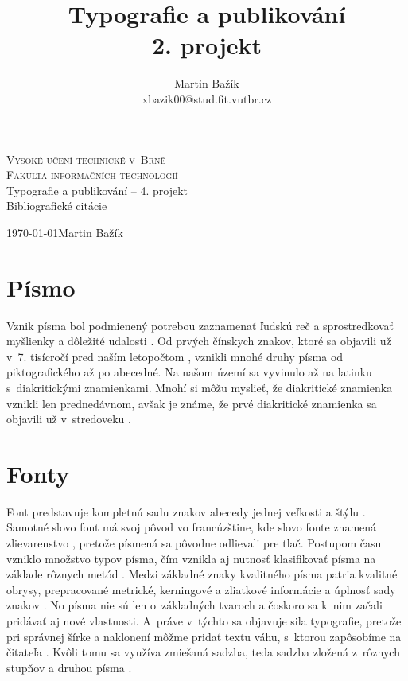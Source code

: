 \documentclass[a4paper,11pt]{article}
\author{Martin Bažík \\ xbazik00@stud.fit.vutbr.cz}
\title{Typografie a publikování \\ 2. projekt}
\begin{document}
	\begin{titlepage}
		\begin{center}
			\textsc{\Huge Vysoké učení technické v~Brně}\\
			\textsc{\huge Fakulta informačních technologií}
			\\{\LARGE Typografie a publikování -- 4. projekt\\
				\Huge Bibliografické citácie }
		\end{center}
		{\Large \today  \hfill Martin Bažík}	
	\end{titlepage}
	\newpage	
	
	\section{Písmo}
	Vznik písma bol podmienený potrebou zaznamenať ľudskú reč a sprostredkovať myšlienky a dôležité udalosti 
	\cite{Lenka_Bubanova:Graficky_dizajn_--_multimedialna_prirucka}. Od prvých čínskych znakov, ktoré sa objavili už v~7. tisícročí pred naším letopočtom \cite{Rickon:cin}, vznikli mnohé druhy písma od piktografického až po abecedné. Na našom území sa vyvinulo až na latinku s~diakritickými znamienkami. Mnohí si môžu myslieť, že diakritické znamienka vznikli len prednedávnom, avšak je známe, že prvé diakritické znamienka sa objavili už v~stredoveku \cite{Filip_Blazek:Diakr}.
	
	\section{Fonty}
	Font predstavuje kompletnú sadu znakov abecedy jednej veľkosti a štýlu \cite{wiki:font}. Samotné slovo font má svoj pôvod vo francúzštine, kde slovo fonte znamená zlievarenstvo \cite{Harper:dict}, pretože písmená sa pôvodne odlievali pre tlač. Postupom času vzniklo množstvo typov písma, čím vznikla aj nutnosť klasifikovať písma na základe rôznych metód \cite{blackwell200420th}. Medzi základné znaky kvalitného písma patria kvalitné obrysy, prepracované  metrické, kerningové a zliatkové informácie a úplnosť sady znakov \cite{Martin_Cerny:Znakove_sady_v_typografickych_systemech}. No písma nie sú len o~základných tvaroch a čoskoro sa k~nim začali pridávať aj nové vlastnosti. A~práve v~týchto sa objavuje sila typografie, pretože pri správnej šírke a naklonení môžme pridať textu váhu, s~ktorou zapôsobíme na čitateľa \cite{Steven_Heller:Type_as_agent_of_Power}. Kvôli tomu sa využíva zmiešaná sadzba, teda sadzba zložená z~rôznych stupňov a druhou písma \cite{Rybicka:Latex_pro_zacatecniky}.
	
\end{document}
